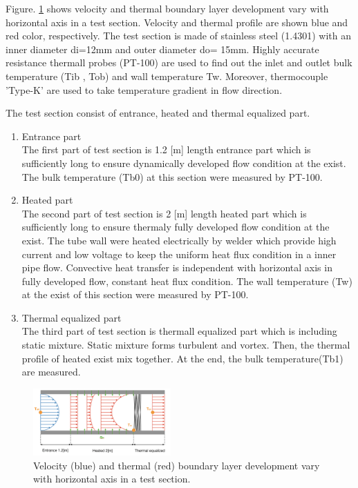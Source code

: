\documentclass[conference]{IEEEtran}
\begin{document}
Figure. \ref{thermal_boundary_layer_development} shows velocity and thermal boundary layer development vary with horizontal axis in a test section.
Velocity and thermal profile are shown blue and red color, respectively.
The test section is made of stainless steel (1.4301) with an inner diameter di=12mm and outer diameter do= 15mm.
Highly accurate resistance thermall probes (PT-100) are used to find out the inlet and outlet bulk temperature (Tib , Tob) and wall temperature Tw.
Moreover, thermocouple 'Type-K' are used to take temperature gradient in flow direction.

The test section consist of entrance, heated and thermal equalized part.
\begin{enumerate}
  \item Entrance part\\
  The first part of test section is 1.2 [m] length entrance part which is sufficiently long to ensure dynamically developed flow condition at the exist.
  The bulk temperature (Tb0) at this section were measured by PT-100.
  \item Heated part\\
  The second part of test section is 2 [m] length heated part which is sufficiently long to ensure thermaly fully developed flow condition at the exist.
  The tube wall were heated electrically by welder which provide high current and low voltage to keep the uniform heat flux condition in a inner pipe flow. 
  Convective heat transfer is independent with horizontal axis in fully developed flow, constant heat flux condition.
  The wall temperature (Tw) at the exist of this section were measured by PT-100.
  \item Thermal equalized part\\
  The third part of test section is thermall equalized part which is including static mixture. Static mixture forms turbulent and vortex. Then, the thermal profile of heated exist mix together. At the end, the bulk temperature(Tb1) are measured.
\end{enumerate}


\begin{figure}[htbp]
  \centering
\includegraphics[width=0.47\textwidth,natwidth=850,natheight=450]{fig/thermal_boundary_layer_development.png}
  \caption{Velocity (blue) and thermal (red) boundary layer development vary with horizontal axis in a test section.}
  \label{thermal_boundary_layer_development}
\end{figure}
\end{document}
